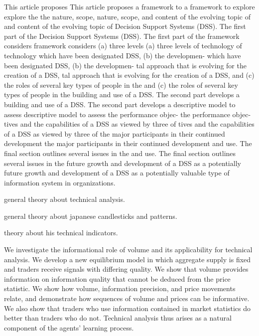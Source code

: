 \cite{Sprague1980} This article proposes This article proposes a framework to a
framework to explore explore the the nature, scope, nature, scope, and content
of the evolving topic of and content of the evolving topic of Decision Support
Systems (DSS). The first part of the Decision Support Systems (DSS). The first
part of the framework considers framework considers (a) three levels (a) three
levels of technology of technology which have been designated DSS, (b) the
developmen- which have been designated DSS, (b) the developmen- tal approach
that is evolving for the creation of a DSS, tal approach that is evolving for
the creation of a DSS, and (c) the roles of several key types of people in the
and (c) the roles of several key types of people in the building and use of a
DSS. The second part develops a building and use of a DSS. The second part
develops a descriptive model to assess descriptive model to assess the
performance objec- the performance objec- tives and the capabilities of a DSS as
viewed by three of tives and the capabilities of a DSS as viewed by three of the
major participants in their continued development the major participants in
their continued development and use. The final section outlines several issues
in the and use. The final section outlines several issues in the future growth
and development of a DSS as a potentially future growth and development of a DSS
as a potentially valuable type of information system in organizations.

\cite{Achelis2000} general theory about technical analysis.

\cite{Nison1991} general theory about japanese candlesticks and patterns.

\cite{Wilder1978} theory about his technical indicators.

\cite{Blume1994} We investigate the informational role of volume and its
applicability for technical analysis. We develop a new equilibrium model in
which aggregate supply is fixed and traders receive signals with differing
quality. We show that volume provides information on information quality that
cannot be deduced from the price statistic. We show how volume, information
precision, and price movements relate, and demonstrate how sequences of volume
and prices can be informative. We also show that traders who use information
contained in market statistics do better than traders who do not. Technical
analysis thus arises as a natural component of the agents’ learning process.

